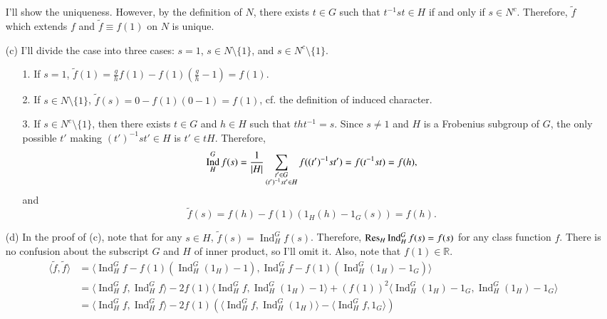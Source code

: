 \documentclass[a4paper, 12pt]{article}
\theoremstyle{Mydefinition}
\theoremstyle{Mytheorem}
\DeclareMathOperator{\Ind}{Ind}
\begin{document}
\begin{enumerate}
    I'll show the uniqueness. However, by the definition of $N$, there exists $t\in G$ such that $t^{-1}st\in H$ if and only if $s\in N^c$. Therefore, $\tilde{f}$ which extends $f$ and $\tilde{f}\equiv f(1)$ on $N$ is unique.
    \item[(c)] I'll divide the case into three cases: $s=1$, $s\in N\setminus\{1\}$, and $s\in N^c\setminus\{1\}$.
    \begin{enumerate}
        \item[1.] If $s=1$, $\tilde{f}(1) = \frac{g}{h}f(1) - f(1)\left(\frac{g}{h}-1\right) = f(1)$.
        \item[2.] If $s\in N\setminus\{1\}$, $\tilde{f}(s) = 0 - f(1)(0-1) = f(1)$, cf. the definition of induced character.
        \item[3.] If $s\in N^c\setminus\{1\}$, then there exists $t\in G$ and $h\in H$ such that $tht^{-1} = s$. Since $s\neq 1$ and $H$ is a Frobenius subgroup of $G$, the only possible $t'$ making $(t')^{-1}st'\in H$ is $t'\in tH$. Therefore,
        \begin{equation}
            \Ind_H^G f(s) = \frac{1}{\abs{H}}\sum_{\substack{t'\in G\\(t')^{-1}st'\in H}}f((t')^{-1}st') = f(t^{-1}st) = f(h),
        \end{equation}
        and
        \begin{equation}
            \tilde{f}(s) = f(h) - f(1)(1_H(h)-1_G(s)) = f(h).
        \end{equation}
    \end{enumerate}
    \item[(d)] In the proof of (c), note that for any $s\in H$, $\tilde{f}(s) = \Ind_H^Gf(s)$. Therefore, $\Res_H\Ind_H^Gf(s) = f(s)$ for any class function $f$. There is no confusion about the subscript $G$ and $H$ of inner product, so I'll omit it. Also, note that $f(1)\in\mathbb{R}$.
    \begin{equation}
    \begin{split}
        \langle \tilde{f}, \tilde{f}\rangle &= \langle \Ind_H^G f - f(1)(\Ind_H^G(1_H)-1), \Ind_H^G f - f(1)(\Ind_H^G(1_H)-1_G)\rangle \\
        &=\langle \Ind_H^G f, \Ind_H^G f \rangle - 2f(1)\langle \Ind_H^G f, \Ind_H^G(1_H)-1\rangle + \left(f(1)\right)^2\langle \Ind_H^G(1_H)-1_G, \Ind_H^G(1_H)-1_G\rangle\\
        &=\langle \Ind_H^G f, \Ind_H^G f \rangle - 2f(1)\left(\langle \Ind_H^G f, \Ind_H^G(1_H)\rangle - \langle \Ind_H^G f, 1_G\rangle\right)\\

\end{split}
\end{equation}
\end{enumerate}
\end{document}
